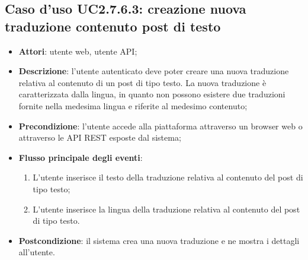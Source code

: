 \subsection{Caso d'uso UC2.7.6.3: creazione nuova traduzione contenuto post di testo}
\begin{itemize}
\item \textbf{Attori}: utente web, utente API;
\item \textbf{Descrizione}: l'utente autenticato deve poter creare una nuova traduzione relativa al contenuto di un post di tipo testo. La nuova traduzione è caratterizzata dalla lingua, in quanto non possono esistere due traduzioni fornite nella medesima lingua e riferite al medesimo contenuto; 
      \item \textbf{Precondizione}: l'utente accede alla piattaforma attraverso un browser web o attraverso le API REST esposte dal sistema;

        \item \textbf{Flusso principale degli eventi}:
          \begin{enumerate}
          \item L'utente inserisce il testo della traduzione relativa al contenuto del post di tipo testo;
          \item L'utente inserisce la lingua della traduzione relativa al contenuto del post di tipo testo.

      \end{enumerate}
    \item \textbf{Postcondizione}: il sistema crea una nuova traduzione e ne mostra i dettagli all'utente.
  \end{itemize}
\hypertarget{UC2.7.6.4}{}
